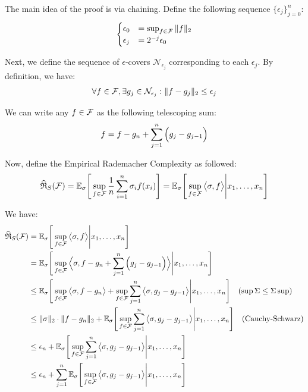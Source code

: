 \begin{proof*}
    The main idea of the proof is via chaining. Define the following sequence $\{\epsilon_j\}_{j=0}^n$:
    \begin{align*}
        \begin{cases}
            \epsilon_0 &= \sup_{f\in\mathcal{F}} \|f\|_2
            \\ 
            \epsilon_j &= 2^{-j}\epsilon_0
        \end{cases}
    \end{align*}

    \noindent Next, we define the sequence of $\epsilon$-covers $\mathcal{N}_{\epsilon_j}$ corresponding to each $\epsilon_j$. By definition, we have:
    \begin{align*}
        \forall f\in\mathcal{F}, \exists g_j \in \mathcal{N}_{\epsilon_j} : \|f-g_j\|_2 \le \epsilon_j
    \end{align*}

    \noindent We can write any $f\in\mathcal{F}$ as the following telescoping sum:
    \begin{align*}
        f = f - g_n + \sum_{j=1}^n \Big( g_j - g_{j-1} \Big)
    \end{align*}

    \noindent Now, define the Empirical Rademacher Complexity as followed:
    \begin{align*}
        \widehat{\mathfrak{R}}_S(\mathcal{F}) = \mathbb{E}_\sigma\Bigg[ 
            \sup_{f\in\mathcal{F}} \frac{1}{n} \sum_{i=1}^n \sigma_i f(x_i) 
         \Bigg] = \mathbb{E}_\sigma\Bigg[ 
            \sup_{f\in\mathcal{F}} \big< \sigma, f \big> \Bigg| x_1, \dots, x_n
         \Bigg]
    \end{align*}

    \noindent We have:
    \begin{align*}
        \widehat{\mathfrak{R}}_S(\mathcal{F}) &= \mathbb{E}_\sigma\Bigg[ 
            \sup_{f\in\mathcal{F}} \big< \sigma, f \big> \Bigg| x_1, \dots, x_n
         \Bigg]\\
        &= \mathbb{E}_\sigma\Bigg[ 
            \sup_{f\in\mathcal{F}} \Big< \sigma, f - g_n + \sum_{j=1}^n \Big( g_j - g_{j-1} \Big) \Big> \Bigg| x_1, \dots, x_n
         \Bigg] \\
        &\le \mathbb{E}_\sigma\Bigg[ 
            \sup_{f\in\mathcal{F}} \big< \sigma, f-g_n\big> + \sup_{f\in\mathcal{F}} \sum_{j=1}^n \big<\sigma, g_j - g_{j-1}\big> \Bigg| x_1, \dots, x_n
         \Bigg] \ \ \ (\sup\Sigma \le \Sigma\sup) \\
        &\le \|\sigma\|_2\cdot\|f-g_n \|_2 + \mathbb{E}_\sigma\Bigg[ 
            \sup_{f\in\mathcal{F}} \sum_{j=1}^n \big<\sigma, g_j - g_{j-1}\big> \Bigg| x_1, \dots, x_n
         \Bigg] \ \ \ (\text{Cauchy-Schwarz}) \\
        &\le \epsilon_n + \mathbb{E}_\sigma\Bigg[ 
            \sup_{f\in\mathcal{F}} \sum_{j=1}^n \big<\sigma, g_j - g_{j-1}\big> \Bigg| x_1, \dots, x_n
         \Bigg] \\
        &\le \epsilon_n + \sum_{j=1}^n \mathbb{E}_\sigma\Bigg[ 
            \sup_{f\in\mathcal{F}} \big<\sigma, g_j - g_{j-1}\big> \Bigg| x_1, \dots, x_n
         \Bigg]
    \end{align*}


\end{proof*}
